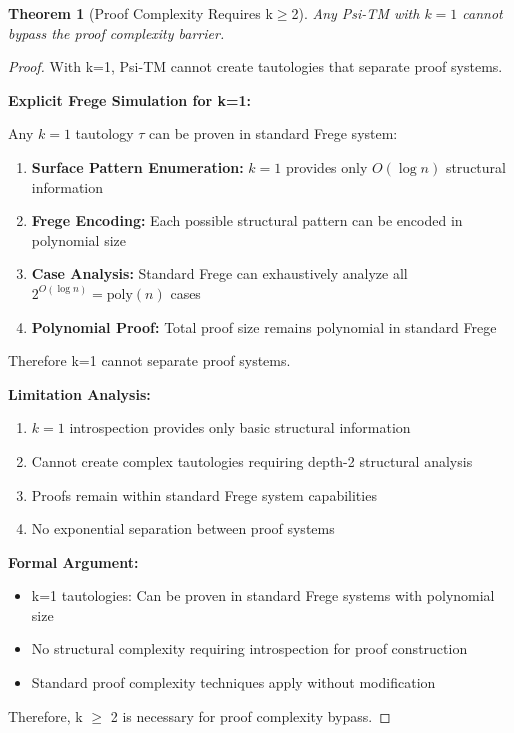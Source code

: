 \documentclass[11pt]{article}
\newtheorem{theorem}{Theorem}[section]
\theoremstyle{definition}
\begin{document}
\begin{theorem}[Proof Complexity Requires k$\geq$2]
\label{thm:proof-complexity-k1}
Any Psi-TM with $k=1$ cannot bypass the proof complexity barrier.
\end{theorem}

\begin{proof}
With k=1, Psi-TM cannot create tautologies that separate proof systems.

\textbf{Explicit Frege Simulation for k=1:}

Any $k=1$ tautology $\tau$ can be proven in standard Frege system:
\begin{enumerate}
\item \textbf{Surface Pattern Enumeration:} $k=1$ provides only $O(\log n)$ structural \\
information
\item \textbf{Frege Encoding:} Each possible structural pattern can be encoded in polynomial size
\item \textbf{Case Analysis:} Standard Frege can exhaustively analyze all \\
$2^{O(\log n)} = \text{poly}(n)$ cases
\item \textbf{Polynomial Proof:} Total proof size remains polynomial in standard Frege
\end{enumerate}
Therefore k=1 cannot separate proof systems.

\textbf{Limitation Analysis:}
\begin{enumerate}
\item $k=1$ introspection provides only basic structural information
\item Cannot create complex tautologies requiring depth-2 structural analysis
\item Proofs remain within standard Frege system capabilities
\item No exponential separation between proof systems
\end{enumerate}

\textbf{Formal Argument:}
\begin{itemize}
\item k=1 tautologies: Can be proven in standard Frege systems with polynomial size
\item No structural complexity requiring introspection for proof construction
\item Standard proof complexity techniques apply without modification
\end{itemize}

Therefore, k $\geq$ 2 is necessary for proof complexity bypass.
\end{proof}
\end{document}
